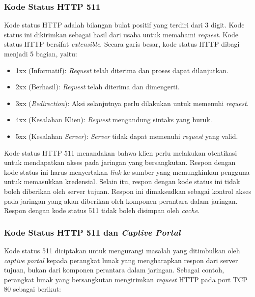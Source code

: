 \subsubsection{Kode Status HTTP 511}
\label{par:http_511}

Kode status HTTP adalah bilangan bulat positif yang terdiri dari 3 digit\cite{IETF_HTTP:2016}. Kode status ini dikirimkan sebagai hasil dari usaha untuk memahami \textit{request}. Kode status HTTP bersifat \textit{extensible}. Secara garis besar, kode status HTTP dibagi menjadi 5 bagian, yaitu:

\begin{itemize}
    \item{1xx (Informatif): \textit{Request} telah diterima dan proses dapat dilanjutkan.}
    \item{2xx (Berhasil): \textit{Request} telah diterima dan dimengerti.}
    \item{3xx (\textit{Redirection}): Aksi selanjutnya perlu dilakukan untuk memenuhi \textit{request}.}
    \item{4xx (Kesalahan Klien): \textit{Request} mengandung sintaks yang buruk.}
    \item{5xx (Kesalahan \textit{Server}): \textit{Server} tidak dapat memenuhi \textit{request} yang valid.}
\end{itemize}

Kode status HTTP 511 menandakan bahwa klien perlu melakukan otentikasi untuk mendapatkan akses pada jaringan yang bersangkutan\cite{IETF_HTTP_AdditionalStatus:2016}. Respon dengan kode status ini harus menyertakan \textit{link} ke sumber yang memungkinkan pengguna untuk memasukkan kredensial. Selain itu, respon dengan kode status ini tidak boleh diberikan oleh server tujuan. Respon ini dimaksudkan sebagai kontrol akses pada jaringan yang akan diberikan oleh komponen perantara dalam jaringan. Respon dengan kode status 511 tidak boleh disimpan oleh \textit{cache}.

\subsubsection{Kode Status HTTP 511 dan \textit{Captive Portal}}
\label{par:http_511_and_captive_portal}

Kode status 511 diciptakan untuk mengurangi masalah yang ditimbulkan oleh \textit{captive portal} kepada perangkat lunak yang mengharapkan respon dari server tujuan, bukan dari komponen perantara dalam jaringan. Sebagai contoh, perangkat lunak yang bersangkutan mengirimkan \textit{request} HTTP pada port TCP 80 sebagai berikut:

